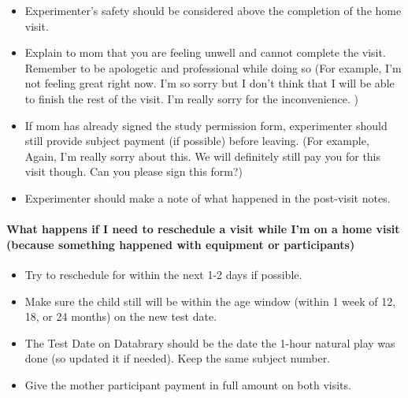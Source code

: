 \documentclass[
  12pt,
]{book}
\providecommand{\tightlist}{%
  \setlength{\itemsep}{0pt}\setlength{\parskip}{0pt}}
\begin{document}
\begin{itemize}
\tightlist
\item
  Experimenter's safety should be considered above the completion of the home visit.\\
\item
  Explain to mom that you are feeling unwell and cannot complete the visit. Remember to be apologetic and professional while doing so (For example, I'm not feeling great right now. I'm so sorry but I don't think that I will be able to finish the rest of the visit. I'm really sorry for the inconvenience. )\\
\item
  If mom has already signed the study permission form, experimenter should still provide subject payment (if possible) before leaving. (For example, Again, I'm really sorry about this. We will definitely still pay you for this visit though. Can you please sign this form?)\\
\item
  Experimenter should make a note of what happened in the post-visit notes.
\end{itemize}

\hypertarget{what-happens-if-i-need-to-reschedule-a-visit-while-im-on-a-home-visit-because-something-happened-with-equipment-or-participants-1}{%
\paragraph*{What happens if I need to reschedule a visit while I'm on a home visit (because something happened with equipment or participants)}\label{what-happens-if-i-need-to-reschedule-a-visit-while-im-on-a-home-visit-because-something-happened-with-equipment-or-participants-1}}

\begin{itemize}
\tightlist
\item
  Try to reschedule for within the next 1-2 days if possible.
\item
  Make sure the child still will be within the age window (within 1 week of 12, 18, or 24 months) on the new test date.
\item
  The Test Date on Databrary should be the date the 1-hour natural play was done (so updated it if needed). Keep the same subject number.
\item
  Give the mother participant payment in full amount on both visits.
\end{itemize}
\end{document}
